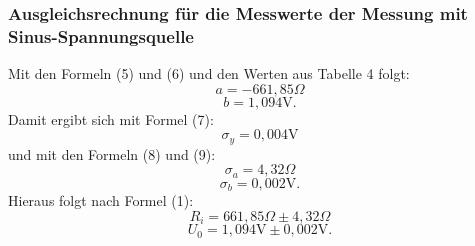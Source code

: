 \subsubsection{Ausgleichsrechnung für die Messwerte der Messung mit Sinus-Spannungsquelle}
Mit den Formeln (5) und (6) und den Werten aus Tabelle 4 folgt:
\begin{displaymath}
a=-661,85\Omega
\end{displaymath}
\begin{displaymath}
b=1,094\text{V.}
\end{displaymath}
Damit ergibt sich mit Formel (7):
\begin{displaymath}
\sigma_y=0,004\text{V}
\end{displaymath}
und mit den Formeln (8) und (9):
\begin{displaymath}
\sigma_a=4,32\Omega
\end{displaymath}
\begin{displaymath}
\sigma_b=0,002\text{V.}
\end{displaymath}
Hieraus folgt nach Formel (1):
\begin{displaymath}
R_i=661,85\Omega\pm 4,32\Omega
\end{displaymath}
\begin{displaymath}
U_0=1,094\text{V}\pm 0,002\text{V.}
\end{displaymath}

























































